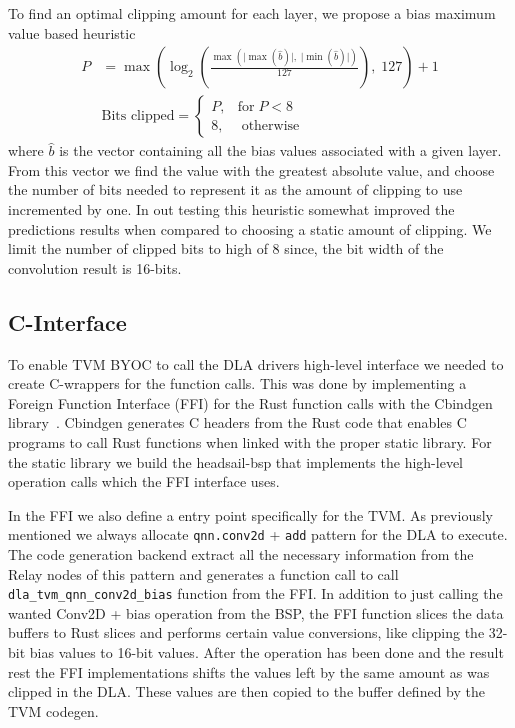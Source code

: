 \documentclass[12pt,a4paper,english
]{tunithesis}
\begin{document}
To find an optimal clipping amount for each layer, we propose a bias maximum value based heuristic
\begin{align}
P & = \max \left( \log_{2} \left( \frac{\max \left( \mathopen| \max(\hat{b}) \mathclose|, \; \mathopen| \min(\hat{b}) \mathclose| \right)}{127} \right), \; 127 \right) + 1 \\
  & \text{Bits clipped} =
  \begin{cases}
    P, &  \text{for} \; P < 8  \\
    8, &  \; \text{otherwise}
  \end{cases}
\end{align}
where $\hat{b}$ is the vector containing all the bias values associated with a given layer. From this vector we find the value with the greatest absolute value, and choose the number of bits needed to represent it as the amount of clipping to use incremented by one. In out testing this heuristic somewhat improved the predictions results when compared to choosing a static amount of clipping.
We limit the number of clipped bits to high of 8 since, the bit width of the convolution result is 16-bits.


\subsection{C-Interface}
To enable TVM BYOC to call the DLA drivers high-level interface we needed to create C-wrappers for the function calls. This was done by implementing a Foreign Function Interface (FFI) for the Rust function calls with the Cbindgen library~\cite{cbindgen}. Cbindgen generates C headers from the Rust code that enables C programs to call Rust functions when linked with the proper static library. For the static library we build the headsail-bsp that implements the high-level operation calls which the FFI interface uses.

In the FFI we also define a entry point specifically for the TVM. As previously mentioned we always allocate \texttt{qnn.conv2d} + \texttt{add} pattern for the DLA to execute. The code generation backend extract all the necessary information from the Relay nodes of this pattern and generates a function call to call \texttt{dla\_tvm\_qnn\_conv2d\_bias} function from the FFI. In addition to just calling the wanted Conv2D + bias operation from the BSP, the FFI function slices the data buffers to Rust slices and performs certain value conversions, like clipping the 32-bit bias values to 16-bit values. After the operation has been done and the result rest the FFI implementations shifts the values left by the same amount as was clipped in the DLA. These values are then copied to the buffer defined by the TVM codegen.
\end{document}
